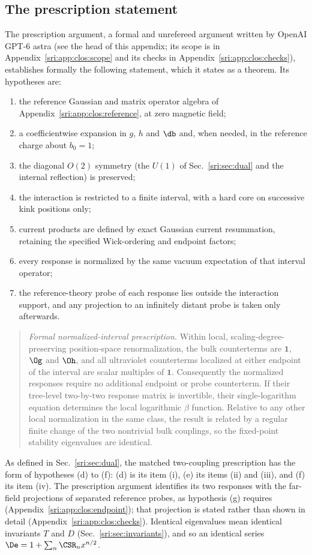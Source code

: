 \subsection{The prescription statement}\label{sri:app:clos:prescription}
The prescription argument, a formal and unrefereed argument written by OpenAI GPT-6 astra (see the head of this
appendix; its scope is in Appendix~\ref{sri:app:clos:scope} and its checks in Appendix~\ref{sri:app:clos:checks}), establishes
formally the following statement, which it states as a theorem. Its hypotheses are:
\begin{enumerate}[label=(\alph*),leftmargin=2em]
\item the reference Gaussian and matrix operator algebra of Appendix~\ref{sri:app:clos:reference}, at zero magnetic field;
\item a coefficientwise expansion in $g$, $h$ and $\db$ and, when needed, in the reference charge about $b_0=1$;
\item the diagonal $O(2)$ symmetry (the $U(1)$ of Sec.~\ref{sri:sec:dual} and the internal reflection) is preserved;
\item the interaction is restricted to a finite interval, with a hard core on successive kink positions only;
\item current products are defined by exact Gaussian current resummation, retaining the specified Wick-ordering and
 endpoint factors;
\item every response is normalized by the same vacuum expectation of that interval operator;
\item the reference-theory probe of each response lies outside the interaction support, and any projection to an
 infinitely distant probe is taken only afterwards.
\end{enumerate}
\begin{quote}
\emph{Formal normalized-interval prescription.} Within local, scaling-degree-preserving position-space
renormalization, the bulk counterterms are $\mathbf 1$, $\Og$ and $\Oh$, and all ultraviolet counterterms localized at
either endpoint of the interval are scalar multiples of $\mathbf 1$. Consequently the normalized responses require no
additional endpoint or probe counterterm. If their tree-level two-by-two response matrix is invertible, their
single-logarithm equation determines the local logarithmic $\beta$ function. Relative to any other local normalization
in the same class, the result is related by a regular finite change of the two nontrivial bulk couplings, so the
fixed-point stability eigenvalues are identical.
\end{quote}
As defined in Sec.~\ref{sri:sec:dual}, the matched two-coupling prescription has the form of hypotheses (d) to (f): (d)
is its item (i), (e) its items (ii) and (iii), and (f) its item (iv). The prescription argument identifies its two
responses with the far-field projections of separated reference probes, as hypothesis (g) requires
(Appendix~\ref{sri:app:clos:endpoint}); that projection is stated rather than shown in detail
(Appendix~\ref{sri:app:clos:checks}). Identical
eigenvalues mean identical invariants $T$ and $D$ (Sec.~\ref{sri:sec:invariants}), and so an identical series
$\De=1+\sum_n\CSR_nx^{n/2}$.


